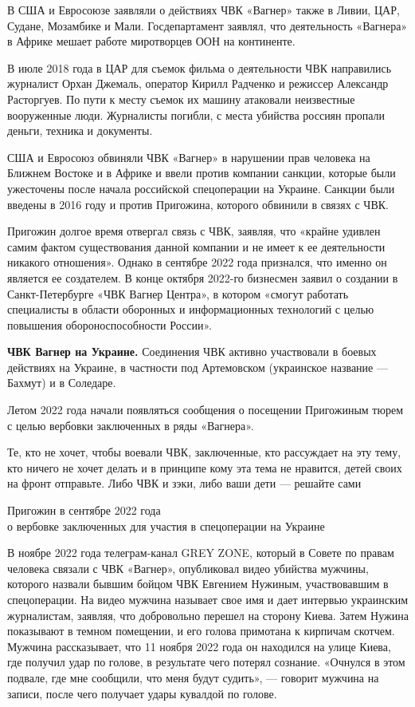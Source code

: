 В США и Евросоюзе заявляли о действиях ЧВК «Вагнер» также в Ливии, ЦАР, Судане, Мозамбике и Мали. Госдепартамент заявлял, что деятельность «Вагнера» в Африке мешает работе миротворцев ООН на континенте.

В июле 2018 года в ЦАР для съемок фильма о деятельности ЧВК направились журналист Орхан Джемаль, оператор Кирилл Радченко и режиссер Александр Расторгуев. По пути к месту съемок их машину атаковали неизвестные вооруженные люди. Журналисты погибли, с места убийства россиян пропали деньги, техника и документы.

США и Евросоюз обвиняли ЧВК «Вагнер» в нарушении прав человека на Ближнем Востоке и в Африке и ввели против компании санкции, которые были ужесточены после начала российской спецоперации на Украине. Санкции были введены в 2016 году и против Пригожина, которого обвинили в связях с ЧВК.

Пригожин долгое время отвергал связь с ЧВК, заявляя, что «крайне удивлен самим фактом существования данной компании и не имеет к ее деятельности никакого отношения». Однако в сентябре 2022 года признался, что именно он является ее создателем. В конце октября 2022-го бизнесмен заявил о создании в Санкт-Петербурге «ЧВК Вагнер Центра», в котором «смогут работать специалисты в области оборонных и информационных технологий с целью повышения обороноспособности России».

\textbf{ЧВК Вагнер на Украине.} Соединения ЧВК активно участвовали в боевых действиях на Украине, в частности под Артемовском (украинское название — Бахмут) и в Соледаре.

Летом 2022 года начали появляться сообщения о посещении Пригожиным тюрем с целью вербовки заключенных в ряды «Вагнера».

\begin{fancyquotes}
    Те, кто не хочет, чтобы воевали ЧВК, заключенные, кто рассуждает на эту тему, кто ничего не хочет делать и в принципе кому эта тема не нравится, детей своих на фронт отправьте. Либо ЧВК и зэки, либо ваши дети — решайте сами

    \begin{flushright}
        Пригожин в сентябре 2022 года\\
        о вербовке заключенных для участия в спецоперации на Украине
    \end{flushright}
\end{fancyquotes}

В ноябре 2022 года телеграм-канал GREY ZONE, который в Совете по правам человека связали с ЧВК «Вагнер», опубликовал видео убийства мужчины, которого назвали бывшим бойцом ЧВК Евгением Нужиным, участвовавшим в спецоперации. На видео мужчина называет свое имя и дает интервью украинским журналистам, заявляя, что добровольно перешел на сторону Киева. Затем Нужина показывают в темном помещении, и его голова примотана к кирпичам скотчем. Мужчина рассказывает, что 11 ноября 2022 года он находился на улице Киева, где получил удар по голове, в результате чего потерял сознание. «Очнулся в этом подвале, где мне сообщили, что меня будут судить», — говорит мужчина на записи, после чего получает удары кувалдой по голове.

